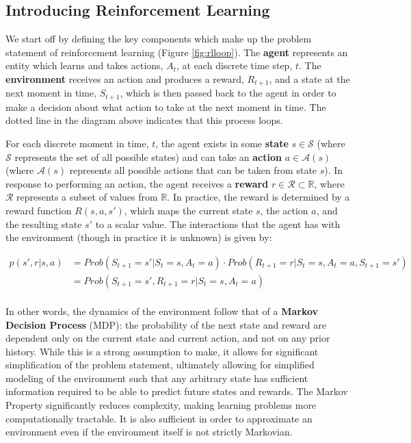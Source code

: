 \documentclass{article}
\begin{document}
\subsection{Introducing Reinforcement Learning}

We start off by defining the key components which make up the problem statement of reinforcement learning (Figure \ref{fig:rlloop}). The \textbf{agent} represents an entity which learns and takes actions, $A_t$, at each discrete time step, $t$. The \textbf{environment} receives an action and produces a reward, $R_{t+1}$, and a state at the next moment in time, $S_{t+1}$, which is then passed back to the agent in order to make a decision about what action to take at the next moment in time. The dotted line in the diagram above indicates that this process loops.

For each discrete moment in time, $t$, the agent exists in some \textbf{state} $s\in \mathcal{S}$ (where $\mathcal{S}$ represents the set of all possible states) and can take an \textbf{action} $a\in \mathcal{A}(s)$ (where $\mathcal{A}(s)$ represents all possible actions that can be taken from state $s$). In response to performing an action, the agent receives a \textbf{reward} $r\in \mathcal{R}\subset\mathbb{R}$, where $\mathcal{R}$ represents a subset of values from $\mathbb{R}$. In practice, the reward is determined by a reward function $R(s,a,s')$, which maps the current state $s$, the action $a$, and the resulting state $s'$ to a scalar value. The interactions that the agent has with the environment (though in practice it is unknown) is given by: 
\vspace{-5mm}\begin{center}
    \begin{align*}
        p(s',r|s,a) &= Prob(S_{t+1}=s'|S_t=s,A_t=a)\cdot Prob(R_{t+1}=r|S_t=s,A_t=a, S_{t+1}=s')\\
        &= Prob(S_{t+1}=s',R_{t+1}=r|S_t=s,A_t=a) \\
    \end{align*}
\end{center}
\vspace{-5mm}In other words, the dynamics of the environment follow that of a \textbf{Markov Decision Process} (MDP): the probability of the next state and reward are dependent only on the current state and current action, and not on any prior history. While this is a strong assumption to make, it allows for significant simplification of the problem statement, ultimately allowing for simplified modeling of the environment such that any arbitrary state has sufficient information required to be able to predict future states and rewards. The Markov Property significantly reduces complexity, making learning problems more computationally tractable. It is also sufficient in order to approximate an environment even if the environment itself is not strictly Markovian.
\end{document}
